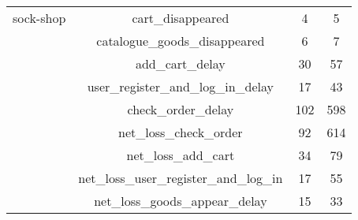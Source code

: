 \begin{table}[htbp]
\begin{tabular}{cccc}
    sock-shop    & cart\_disappeared                       & 4        & 5          \\
                 & catalogue\_goods\_disappeared           & 6        & 7          \\
                 & add\_cart\_delay                        & 30       & 57         \\
                 & user\_register\_and\_log\_in\_delay     & 17       & 43         \\
                 & check\_order\_delay                     & 102      & 598        \\
                 & net\_loss\_check\_order                 & 92       & 614        \\
                 & net\_loss\_add\_cart                    & 34       & 79         \\
                 & net\_loss\_user\_register\_and\_log\_in & 17       & 55         \\
                 & net\_loss\_goods\_appear\_delay         & 15       & 33         \\ \bottomrule
    \end{tabular}
\end{table}

